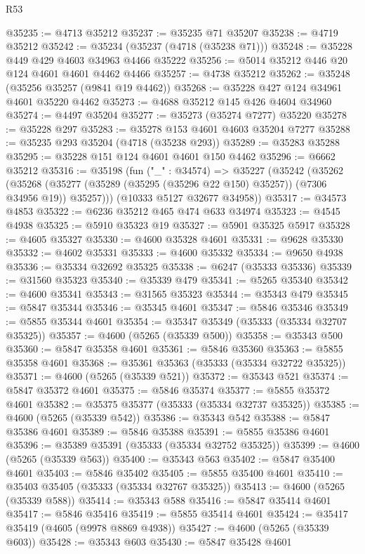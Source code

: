 \begin{lexlean}{R53}
\begin{coremodule}
@35235 := @4713 @35212
@35237 := @35235 @71 @35207
@35238 := @4719 @35212
@35242 := @35234 (@35237 (@4718 (@35238 @71)))
@35248 := @35228 @449 @429 @4603 @34963 @4466 @35222
@35256 := @5014 @35212 @446 @20 @124 @4601 @4601 @4462 @4466
@35257 := @4738 @35212
@35262 := @35248 (@35256 @35257 (@9841 @19 @4462))
@35268 := @35228 @427 @124 @34961 @4601 @35220 @4462
@35273 := @4688 @35212 @145 @426 @4604 @34960
@35274 := @4497 @35204
@35277 := @35273 (@35274 @7277) @35220
@35278 := @35228 @297
@35283 := @35278 @153 @4601 @4603 @35204 @7277
@35288 := @35235 @293 @35204 (@4718 (@35238 @293))
@35289 := @35283 @35288
@35295 := @35228 @151 @124 @4601 @4601 @150 @4462
@35296 := @6662 @35212
@35316 := @35198
    (fun ("_" : @34574) =>
    @35227
      (@35242
        (@35262
          (@35268 (@35277 (@35289 (@35295 (@35296 @22 @150) @35257)) (@7306 @34956 @19)) @35257)))
      (@10333 @5127 @32677 @34958))
@35317 := @34573 @4853
@35322 := @6236 @35212 @465 @474 @633 @34974
@35323 := @4545 @4938
@35325 := @5910 @35323 @19
@35327 := @5901 @35325 @5917
@35328 := @4605 @35327
@35330 := @4600 @35328 @4601
@35331 := @9628 @35330
@35332 := @4602 @35331
@35333 := @4600 @35332
@35334 := @9650 @4938
@35336 := @35334 @32692 @35325
@35338 := @6247 (@35333 @35336)
@35339 := @31560 @35323
@35340 := @35339 @479
@35341 := @5265 @35340
@35342 := @4600 @35341
@35343 := @31565 @35323
@35344 := @35343 @479
@35345 := @5847 @35344
@35346 := @35345 @4601
@35347 := @5846 @35346
@35349 := @5855 @35344 @4601
@35354 := @35347 @35349 (@35333 (@35334 @32707 @35325))
@35357 := @4600 (@5265 (@35339 @500))
@35358 := @35343 @500
@35360 := @5847 @35358 @4601
@35361 := @5846 @35360
@35363 := @5855 @35358 @4601
@35368 := @35361 @35363 (@35333 (@35334 @32722 @35325))
@35371 := @4600 (@5265 (@35339 @521))
@35372 := @35343 @521
@35374 := @5847 @35372 @4601
@35375 := @5846 @35374
@35377 := @5855 @35372 @4601
@35382 := @35375 @35377 (@35333 (@35334 @32737 @35325))
@35385 := @4600 (@5265 (@35339 @542))
@35386 := @35343 @542
@35388 := @5847 @35386 @4601
@35389 := @5846 @35388
@35391 := @5855 @35386 @4601
@35396 := @35389 @35391 (@35333 (@35334 @32752 @35325))
@35399 := @4600 (@5265 (@35339 @563))
@35400 := @35343 @563
@35402 := @5847 @35400 @4601
@35403 := @5846 @35402
@35405 := @5855 @35400 @4601
@35410 := @35403 @35405 (@35333 (@35334 @32767 @35325))
@35413 := @4600 (@5265 (@35339 @588))
@35414 := @35343 @588
@35416 := @5847 @35414 @4601
@35417 := @5846 @35416
@35419 := @5855 @35414 @4601
@35424 := @35417 @35419 (@4605 (@9978 @8869 @4938))
@35427 := @4600 (@5265 (@35339 @603))
@35428 := @35343 @603
@35430 := @5847 @35428 @4601

\end{coremodule}
\end{lexlean}
